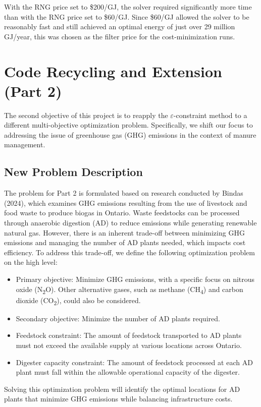 \documentclass[12pt]{article}
\begin{document}
With the RNG price set to \$200/GJ, the solver required significantly more time than with the RNG price set to \$60/GJ. Since \$60/GJ allowed the solver to be reasonably fast and still achieved an optimal energy of just over 29 million GJ/year, this was chosen as the filter price for the cost-minimization runs.


\section{Code Recycling and Extension (Part 2)}
The second objective of this project is to reapply the $\varepsilon$-constraint method to a different multi-objective optimization problem. Specifically, we shift our focus to addressing the issue of greenhouse gas (GHG) emissions in the context of manure management.

\subsection{New Problem Description}
The problem for Part 2 is formulated based on research conducted by Bindas (2024), which examines GHG emissions resulting from the use of livestock and food waste to produce biogas in Ontario. Waste feedstocks can be processed through anaerobic digestion (AD) to reduce emissions while generating renewable natural gas. However, there is an inherent trade-off between minimizing GHG emissions and managing the number of AD plants needed, which impacts cost efficiency. To address this trade-off, we define the following optimization problem on the high level:
\begin{itemize}
  \item Primary objective: Minimize GHG emissions, with a specific focus on nitrous oxide (N\textsubscript{2}O). Other alternative gases, such as methane (CH\textsubscript{4}) and carbon dioxide (CO\textsubscript{2}), could also be considered.
  \item Secondary objective: Minimize the number of AD plants required.
  \item Feedstock constraint: The amount of feedstock transported to AD plants must not exceed the available supply at various locations across Ontario.
  \item Digester capacity constraint: The amount of feedstock processed at each AD plant must fall within the allowable operational capacity of the digester.
\end{itemize}
Solving this optimization problem will identify the optimal locations for AD plants that minimize GHG emissions while balancing infrastructure costs.
\end{document}
